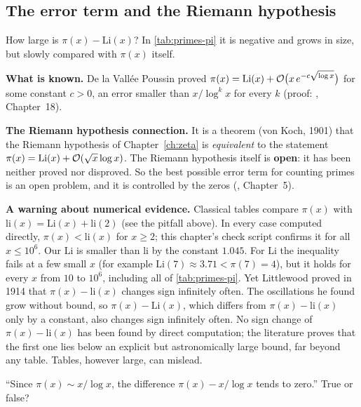 \subsection{The error term and the Riemann hypothesis}

How large is $\pi(x)-\mathrm{Li}(x)$? In \cref{tab:primes-pi} it is negative and grows in size, but slowly compared with $\pi(x)$ itself.

\begin{beyond}
\textbf{What is known.} De la Vall\'ee Poussin proved $\pi(x)=\mathrm{Li}(x)+\mathcal{O}\bigl(x\,e^{-c\sqrt{\log x}}\bigr)$ for some constant $c>0$, an error smaller than $x/\log^kx$ for every $k$ (proof: \cite{davenport}, Chapter~18).

\textbf{The Riemann hypothesis connection.} It is a theorem (von Koch, 1901) that the Riemann hypothesis of Chapter~\ref{ch:zeta} is \emph{equivalent} to the statement $\pi(x)=\mathrm{Li}(x)+\mathcal{O}(\sqrt x\log x)$. The Riemann hypothesis itself is \textbf{open}: it has been neither proved nor disproved. So the best possible error term for counting primes is an open problem, and it is controlled by the zeros (\cite{edwards}, Chapter~5).

\textbf{A warning about numerical evidence.} Classical tables compare $\pi(x)$ with $\mathrm{li}(x)=\mathrm{Li}(x)+\mathrm{li}(2)$ (see the pitfall above). In every case computed directly, $\pi(x)<\mathrm{li}(x)$ for $x\ge2$; this chapter's check script confirms it for all $x\le10^6$. Our $\mathrm{Li}$ is smaller than $\mathrm{li}$ by the constant $1.045$. For $\mathrm{Li}$ the inequality fails at a few small $x$ (for example $\mathrm{Li}(7)\approx3.71<\pi(7)=4$), but it holds for every $x$ from $10$ to $10^6$, including all of \cref{tab:primes-pi}. Yet Littlewood proved in 1914 that $\pi(x)-\mathrm{li}(x)$ changes sign infinitely often. The oscillations he found grow without bound, so $\pi(x)-\mathrm{Li}(x)$, which differs from $\pi(x)-\mathrm{li}(x)$ only by a constant, also changes sign infinitely often. No sign change of $\pi(x)-\mathrm{li}(x)$ has been found by direct computation; the literature proves that the first one lies below an explicit but astronomically large bound, far beyond any table. Tables, however large, can mislead.
\end{beyond}

\begin{checkpoint}
``Since $\pi(x)\sim x/\log x$, the difference $\pi(x)-x/\log x$ tends to zero.'' True or false?
\end{checkpoint}

